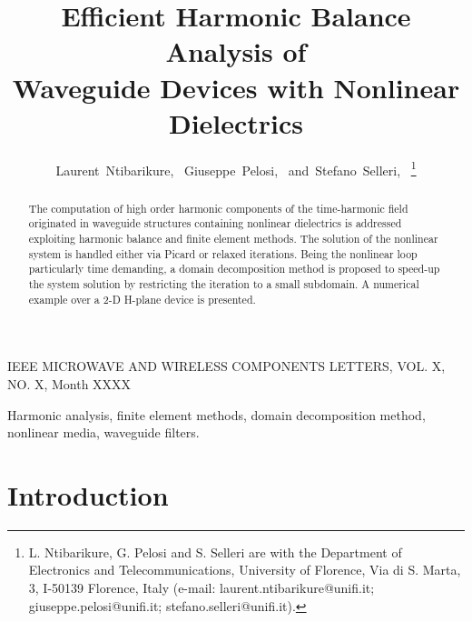 \documentclass[journal,twoside]{IEEEtran}
\begin{document}

\title{Efficient Harmonic Balance Analysis of \\ Waveguide Devices with Nonlinear Dielectrics}
\author{ Laurent~Ntibarikure,~
		Giuseppe~Pelosi,~
        and~Stefano~Selleri,~
        \thanks{ L. Ntibarikure, G. Pelosi and S. Selleri are with the
        Department of Electronics and Telecommunications, University of 
        Florence, Via di S. Marta, 3, I-50139 Florence, Italy (e-mail:
        laurent.ntibarikure@unifi.it; giuseppe.pelosi@unifi.it; stefano.selleri@unifi.it). }}

{IEEE MICROWAVE AND WIRELESS COMPONENTS LETTERS, VOL. X, NO. X, Month XXXX}

\maketitle

\begin{abstract}
The computation of high order harmonic components of the time-harmonic field
originated in waveguide structures containing nonlinear dielectrics is addressed
exploiting harmonic balance and finite element methods. The solution of the
nonlinear system is handled either via Picard or relaxed iterations. Being the
nonlinear loop particularly time demanding, a domain decomposition method is 
proposed to speed-up the system solution by restricting the iteration to a small
subdomain. A numerical example over a \mbox{2-D} H-plane device is presented.
\end{abstract}

\begin{IEEEkeywords}
Harmonic analysis, finite element methods, domain decomposition method,
nonlinear media, waveguide filters.
\end{IEEEkeywords}

\IEEEpeerreviewmaketitle

\section{Introduction}
\end{document}

